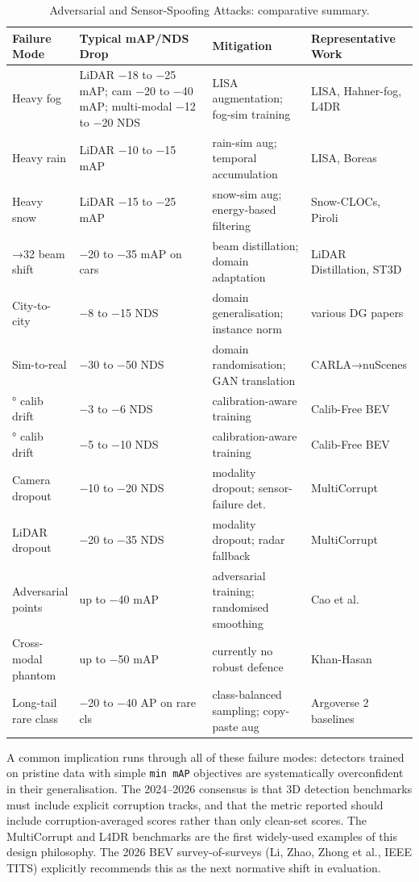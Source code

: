 \documentclass{article}
\begin{document}
\begin{table}[t]
\centering
\caption{Adversarial and Sensor-Spoofing Attacks: comparative summary.}
\label{tab:adversarial-and-sensor-spoofing-attacks}
\begin{tabular}{>{\raggedright\arraybackslash}p{0.1299\linewidth}
  >{\raggedright\arraybackslash}p{0.4416\linewidth}
  >{\raggedright\arraybackslash}p{0.2727\linewidth}
  >{\raggedright\arraybackslash}p{0.1558\linewidth}}
\toprule
Failure Mode & Typical mAP/NDS Drop & Mitigation & Representative Work \\
\midrule
Heavy fog & LiDAR −18 to −25 mAP; cam −20 to −40 mAP; multi-modal −12 to −20 NDS & LISA augmentation; fog-sim training & LISA, Hahner-fog, L4DR \\
Heavy rain & LiDAR −10 to −15 mAP & rain-sim aug; temporal accumulation & LISA, Boreas \\
Heavy snow & LiDAR −15 to −25 mAP & snow-sim aug; energy-based filtering & Snow-CLOCs, Piroli \\
64→32 beam shift & −20 to −35 mAP on cars & beam distillation; domain adaptation & LiDAR Distillation, ST3D \\
City-to-city & −8 to −15 NDS & domain generalisation; instance norm & various DG papers \\
Sim-to-real & −30 to −50 NDS & domain randomisation; GAN translation & CARLA→nuScenes \\
0.5° calib drift & −3 to −6 NDS & calibration-aware training & Calib-Free BEV \\
1.0° calib drift & −5 to −10 NDS & calibration-aware training & Calib-Free BEV \\
Camera dropout & −10 to −20 NDS & modality dropout; sensor-failure det. & MultiCorrupt \\
LiDAR dropout & −20 to −35 NDS & modality dropout; radar fallback & MultiCorrupt \\
Adversarial points & up to −40 mAP & adversarial training; randomised smoothing & Cao et al. \\
Cross-modal phantom & up to −50 mAP & currently no robust defence & Khan-Hasan \\
Long-tail rare class & −20 to −40 AP on rare cls & class-balanced sampling; copy-paste aug & Argoverse 2 baselines \\
\end{tabular}
\end{table}

A common implication runs through all of these failure modes: detectors trained on pristine data with simple \texttt{min\ mAP} objectives are systematically overconfident in their generalisation. The 2024--2026 consensus is that 3D detection benchmarks must include explicit corruption tracks, and that the metric reported should include corruption-averaged scores rather than only clean-set scores. The MultiCorrupt and L4DR benchmarks are the first widely-used examples of this design philosophy. The 2026 BEV survey-of-surveys (Li, Zhao, Zhong et al., IEEE TITS) explicitly recommends this as the next normative shift in evaluation.
\end{document}
